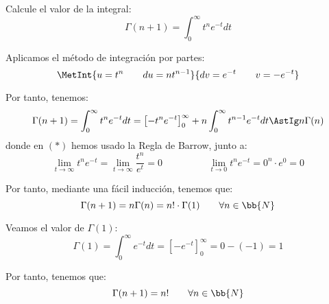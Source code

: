\begin{ejercicio}
    Calcule el valor de la integral:
    \begin{equation*}
        \Gamma(n+1) = \int_0^{\infty} t^{n} e^{-t} dt
    \end{equation*}

    Aplicamos el método de integración por partes:
    \begin{equation*}
        \MetInt{u = t^n \qquad du=nt^{n-1}}{dv = e^{-t} \qquad v = -e^{-t}}
    \end{equation*}

    Por tanto, tenemos:
    \begin{equation*}
        \Gamma(n+1) = \int_0^\infty t^n e^{-t} dt = \left[-t^n e^{-t}\right]_0^\infty + n\int_0^\infty t^{n-1} e^{-t} dt \AstIg n\Gamma(n)
    \end{equation*}
    donde en $(\ast)$ hemos usado la Regla de Barrow, junto a:
    \begin{equation*}
        \lim_{t\to\infty} t^n e^{-t} = \lim_{t\to\infty} \dfrac{t^n}{e^t} = 0 \hspace{2cm}
        \lim_{t\to 0} t^n e^{-t} = 0^n\cdot e^0 = 0
    \end{equation*}

    Por tanto, mediante una fácil inducción, tenemos que:
    \begin{equation*}
        \Gamma(n+1) = n\Gamma(n) = n!\cdot \Gamma(1) \qquad \forall n\in \bb{N}
    \end{equation*}

    Veamos el valor de $\Gamma(1)$:
    \begin{equation*}
        \Gamma(1) = \int_0^\infty e^{-t} dt = \left[-e^{-t}\right]_0^\infty = 0 - (-1) = 1
    \end{equation*}

    Por tanto, tenemos que:
    \begin{equation*}
        \Gamma(n+1) = n! \qquad \forall n\in \bb{N}
    \end{equation*}
\end{ejercicio}



